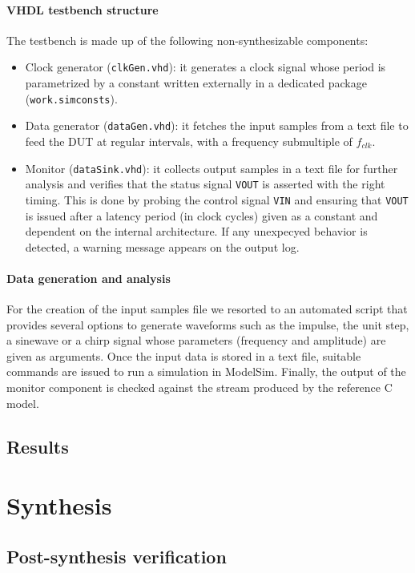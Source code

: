 \paragraph{VHDL testbench structure} The testbench is made up of the following non-synthesizable components:
\begin{itemize}
	\item Clock generator (\texttt{clkGen.vhd}): it generates a clock signal whose period is parametrized by a constant written externally in a dedicated package (\texttt{work.simconsts}).
	\item Data generator (\texttt{dataGen.vhd}): it fetches the input samples from a text file to feed the DUT at regular intervals, with a frequency submultiple of $f_{clk}$.
	\item Monitor (\texttt{dataSink.vhd}): it collects output samples in a text file for further analysis and verifies that the status signal \texttt{VOUT} is asserted with the right timing. This is done by probing the control signal \texttt{VIN} and ensuring that \texttt{VOUT} is issued after a latency period (in clock cycles) given as a constant and dependent on the internal architecture. If any unexpecyed behavior is detected, a warning message appears on the output log.
\end{itemize}

\paragraph{Data generation and analysis} For the creation of the input samples file we resorted to an automated script that provides several options to generate waveforms such as the impulse, the unit step, a sinewave or a chirp signal whose parameters (frequency and amplitude) are given as arguments. Once the input data is stored in a text file, suitable commands are issued to run a simulation in ModelSim. Finally, the output of the monitor component is checked against the stream produced by the reference C model. 

\subsection{Results}

\section{Synthesis}
\subsection{Post-synthesis verification}
